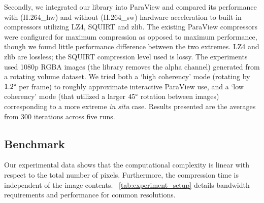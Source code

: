 \documentclass{vgtc}                          %
\begin{document}

Secondly, we integrated our library into ParaView and compared its
performance with (H.264\_hw) and without (H.264\_sw) hardware acceleration to built-in
compressors utilizing LZ4, SQUIRT and zlib.  The existing ParaView
compressors were configured for maximum compression as opposed to
maximum performance, though we found little performance difference
between the two extremes.  LZ4 and zlib are lossless; the SQUIRT
compression level used is lossy.  The experiments used 1080p RGBA
images (the library removes the alpha channel) generated from a
rotating volume dataset.  We tried both a `high coherency' mode
(rotating by
$1.2\degree{}$ per frame) to roughly approximate interactive ParaView
use, and a `low coherency' mode (that utilized a larger $45\degree{}$
rotation between
images) corresponding to a more extreme \textit{in situ} case.  Results
presented are the averages from 300 iterations across five runs.


\subsection{Benchmark}


Our experimental data shows that the computational complexity is
linear with respect to the total number of pixels.  Furthermore, the
compression time is independent of the image contents.
~\cref{tab:experiment_setup} details bandwidth requirements and
performance for common resolutions.
\end{document}
